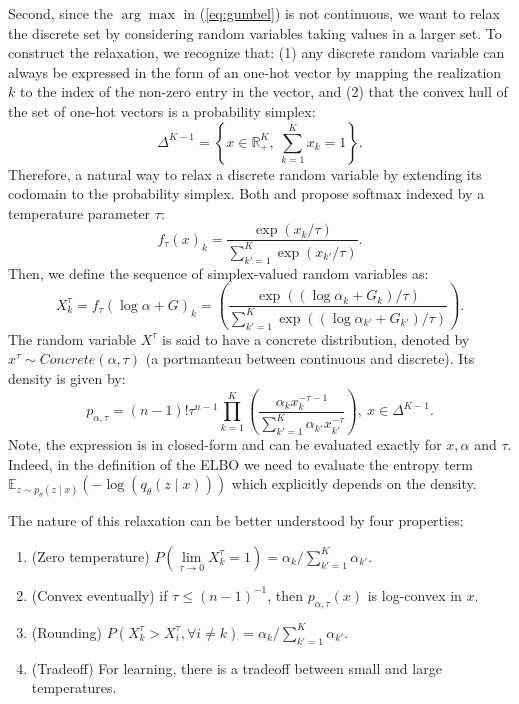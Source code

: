 \documentclass[11pt]{article}
\def\E{\mathbb{E}}
\begin{document}
Second, since the $\arg\max$ in (\ref{eq:gumbel}) is not continuous, we want to relax the discrete set by considering random variables taking values in a larger set. To construct the relaxation, we recognize that: (1) any discrete random variable can always be expressed in the form of an one-hot vector by mapping the realization $k$ to the index of the non-zero entry in the vector, and (2) that the convex hull of the set of one-hot vectors is a probability simplex:
\begin{equation}
\Delta^{K-1} = \left\{ x \in \mathbb{R}_+^K,\: \sum_{k=1}^K x_k=1 \right\}.
\end{equation}
Therefore, a natural way to relax a discrete random variable by extending its codomain to the probability simplex. Both \cite{MaddisonMT16} and \cite{jang2016categorical} propose softmax indexed by a temperature parameter $\tau$:
\begin{equation}
f_\tau(x)_k = \frac{ \exp(x_k/\tau) }{ \sum_{k'=1}^K\exp(x_{k'}/\tau) }.
\end{equation}
Then, we define the sequence of simplex-valued random variables as:
\begin{equation}
X^\tau_k = f_\tau(\log\alpha+G)_k = \left( \frac{\exp((\log\alpha_k+G_k)/\tau)}{\sum_{k'=1}^K\exp((\log\alpha_{k'}+G_{k'})/\tau)} \right).
\end{equation}
The random variable $X^\tau$ is said to have a concrete distribution, denoted by $x^\tau\sim Concrete(\alpha,\tau)$ (a portmanteau between continuous and discrete). Its density is given by:
\begin{equation}
p_{\alpha,\tau} = (n-1)!\tau^{n-1}\prod_{k=1}^K\left( \frac{\alpha_k x_k^{-\tau-1}}{\sum_{k'=1}^K \alpha_{k'} x_{k'}^{-\tau}} \right),\:x\in\Delta^{K-1}.
\end{equation}
Note, the expression is in closed-form and can be evaluated exactly for $x,\alpha$ and $\tau$. Indeed, in the definition of the ELBO we need to evaluate the entropy term $\E_{z\sim p_\theta(z\mid x)}(-\log(q_\theta(z\mid x)))$ which explicitly depends on the density.

The nature of this relaxation can be better understood by four properties:
\begin{enumerate}
\item (Zero temperature) $P(\underset{\tau\rightarrow0}{\lim}X_k^\tau=1) = \alpha_k / \sum_{k'=1}^K\alpha_{k'}$.
\item (Convex eventually) if $\tau\leq(n-1)^{-1}$, then $p_{\alpha,\tau}(x)$ is log-convex in $x$.
\item (Rounding) $P(X_k^\tau>X_i^\tau,\forall i\neq k) =  \alpha_k / \sum_{k'=1}^K\alpha_{k'}$.
\item (Tradeoff) For learning, there is a tradeoff between small and large temperatures.
\end{enumerate}
\end{document}
